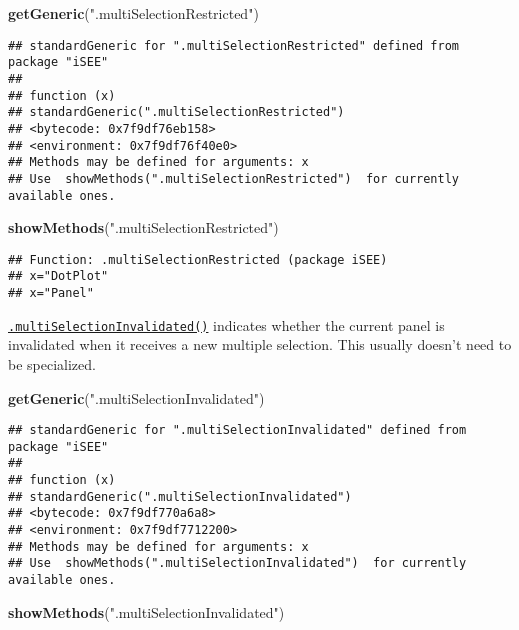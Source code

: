 \documentclass[
]{book}
\newenvironment{Shaded}{\begin{snugshade}}{\end{snugshade}}
\newcommand{\KeywordTok}[1]{\textcolor[rgb]{0.13,0.29,0.53}{\textbf{#1}}}
\newcommand{\NormalTok}[1]{#1}
\newcommand{\StringTok}[1]{\textcolor[rgb]{0.31,0.60,0.02}{#1}}
\begin{document}
\begin{Shaded}
\begin{Highlighting}[]
\KeywordTok{getGeneric}\NormalTok{(}\StringTok{".multiSelectionRestricted"}\NormalTok{)}
\end{Highlighting}
\end{Shaded}

\begin{verbatim}
## standardGeneric for ".multiSelectionRestricted" defined from package "iSEE"
## 
## function (x) 
## standardGeneric(".multiSelectionRestricted")
## <bytecode: 0x7f9df76eb158>
## <environment: 0x7f9df76f40e0>
## Methods may be defined for arguments: x
## Use  showMethods(".multiSelectionRestricted")  for currently available ones.
\end{verbatim}

\begin{Shaded}
\begin{Highlighting}[]
\KeywordTok{showMethods}\NormalTok{(}\StringTok{".multiSelectionRestricted"}\NormalTok{)}
\end{Highlighting}
\end{Shaded}

\begin{verbatim}
## Function: .multiSelectionRestricted (package iSEE)
## x="DotPlot"
## x="Panel"
\end{verbatim}

\href{https://isee.github.io/iSEE/reference/multi-select-generics.html}{\texttt{.multiSelectionInvalidated()}} indicates whether the current panel is invalidated when it receives a new multiple selection.
This usually doesn't need to be specialized.

\begin{Shaded}
\begin{Highlighting}[]
\KeywordTok{getGeneric}\NormalTok{(}\StringTok{".multiSelectionInvalidated"}\NormalTok{)}
\end{Highlighting}
\end{Shaded}

\begin{verbatim}
## standardGeneric for ".multiSelectionInvalidated" defined from package "iSEE"
## 
## function (x) 
## standardGeneric(".multiSelectionInvalidated")
## <bytecode: 0x7f9df770a6a8>
## <environment: 0x7f9df7712200>
## Methods may be defined for arguments: x
## Use  showMethods(".multiSelectionInvalidated")  for currently available ones.
\end{verbatim}

\begin{Shaded}
\begin{Highlighting}[]
\KeywordTok{showMethods}\NormalTok{(}\StringTok{".multiSelectionInvalidated"}\NormalTok{)}
\end{Highlighting}
\end{Shaded}
\end{document}
